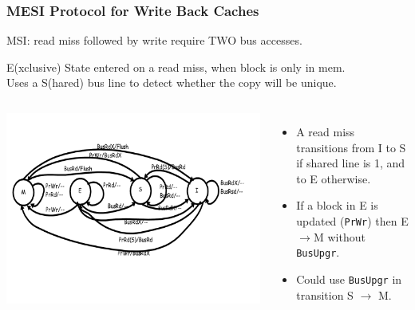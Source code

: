 \documentclass{beamer}
\newcommand{\emp}[1]{\textcolor{DikuRed}{ #1}}
\begin{document}
\begin{frame}[fragile,t]
\frametitle{MESI Protocol for Write Back Caches}

MSI: read miss followed by write require TWO bus accesses.\smallskip

\emp{E(xclusive)} State entered on a read miss, when block is only in mem.\\
Uses a \emp{S(hared) bus line} to detect whether the copy will be unique.


\begin{columns}\hspace{-7ex}
\includegraphics[width=55ex]{FigsInfCoherence/MESI}\pause
{}
\vspace{-3ex}
\begin{itemize}
    \item A read miss transitions from I to S if shared line is 1, and to E otherwise.
    \item If a block in E is updated ({\tt PrWr}) then E$\rightarrow$M without {\tt BusUpgr}.
    \item Could use {\tt BusUpgr} in transition S $\rightarrow$ M. 
\end{itemize}
\end{columns}

\end{frame}
\end{document}
